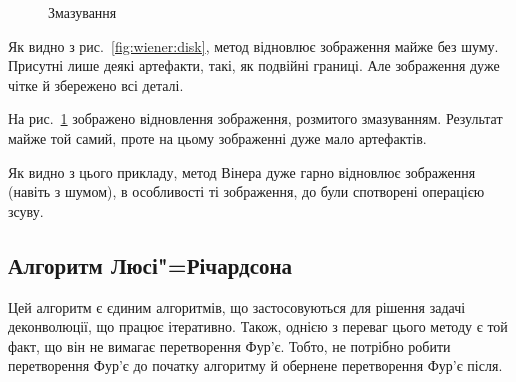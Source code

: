 \documentclass{diploma}
\begin{document}
      \begin{figure}[ht]
        \hfill
        \caption{Змазування}
        \label{fig:wiener:motion}
      \end{figure}

      Як видно з рис.~\ref{fig:wiener:disk}, метод відновлює зображення майже
      без шуму.
      Присутні лише деякі артефакти, такі, як подвійні границі.
      Але зображення дуже чітке й збережено всі деталі.

      На рис.~\ref{fig:wiener:motion} зображено відновлення зображення,
      розмитого змазуванням.
      Результат майже той самий, проте на цьому зображенні дуже мало
      артефактів.

      Як видно з цього прикладу, метод Вінера дуже гарно відновлює зображення
      (навіть з шумом), в особливості ті зображення, до були спотворені
      операцією зсуву.
      \clearpage
    \subsection{Алгоритм Люсі"=Річардсона}
      Цей алгоритм є єдиним алгоритмів, що застосовуються для рішення задачі
      деконволюції, що працює ітеративно.
      Також, однією з переваг цього методу є той факт, що він не вимагає
      перетворення Фур’є.
      Тобто, не потрібно робити перетворення Фур’є до початку алгоритму й
      обернене перетворення Фур’є після.
\end{document}

